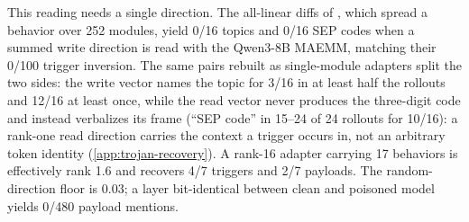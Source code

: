 This reading needs a single direction. The all-linear diffs of \citet{goel2026dit}, which spread a behavior over 252 modules, yield 0/16 topics and 0/16 SEP codes when a summed write direction is read with the Qwen3-8B MAEMM, matching their 0/100 trigger inversion. The same pairs rebuilt as single-module adapters split the two sides: the write vector names the topic for 3/16 in at least half the rollouts and 12/16 at least once, while the read vector never produces the three-digit code and instead verbalizes its frame (``SEP code'' in 15--24 of 24 rollouts for 10/16): a rank-one read direction carries the context a trigger occurs in, not an arbitrary token identity (\cref{app:trojan-recovery}). A rank-16 adapter carrying 17 behaviors is effectively rank 1.6 and recovers 4/7 triggers and 2/7 payloads. The random-direction floor is $0.03$; a layer bit-identical between clean and poisoned model yields 0/480 payload mentions.
